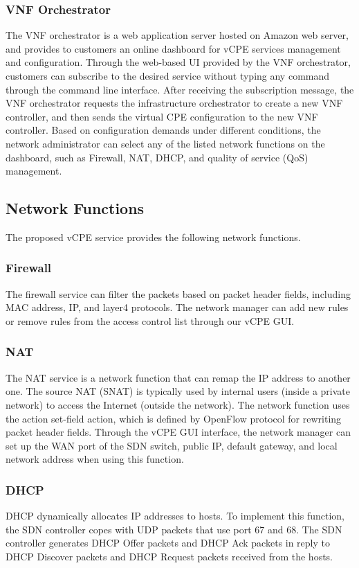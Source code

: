 \documentclass[journal]{IEEEtran}
\begin{document}
\subsubsection{VNF Orchestrator}
The VNF orchestrator is a web application server hosted on Amazon web server, and provides to customers an online dashboard for vCPE services management and configuration. Through the web-based UI provided by the VNF orchestrator, customers can subscribe to the desired service without typing any command through the command line interface. After receiving the subscription message, the VNF orchestrator requests the infrastructure orchestrator to create a new VNF controller, and then sends the virtual CPE configuration to the new VNF controller. Based on configuration demands under different conditions, the network administrator can select any of the listed network functions on the dashboard, such as Firewall, NAT, DHCP, and quality of service (QoS) management.



\subsection{Network Functions}
The proposed vCPE service provides the following network functions.

\subsubsection{Firewall}
The firewall service can filter the packets based on packet header fields, including MAC address, IP, and layer4 protocols. The network manager can add new rules or remove rules from the access control list through our vCPE GUI.

\subsubsection{NAT}
The NAT service is a network function that can remap the IP address to another one. The source NAT (SNAT) is typically used by internal users (inside a private network) to access the Internet (outside the network). The network function uses the action set-field action, which is defined by OpenFlow protocol for rewriting packet header fields. Through the vCPE GUI interface, the network manager can set up the WAN port of the SDN switch, public IP, default gateway, and local network address when using this function.

\subsubsection{DHCP}
DHCP dynamically allocates IP addresses to hosts.
To implement this function, the SDN controller copes with UDP packets that use port 67 and 68.
The SDN controller generates DHCP Offer packets and DHCP Ack packets in reply to DHCP Discover packets and DHCP Request packets received from the hosts.
\end{document}
